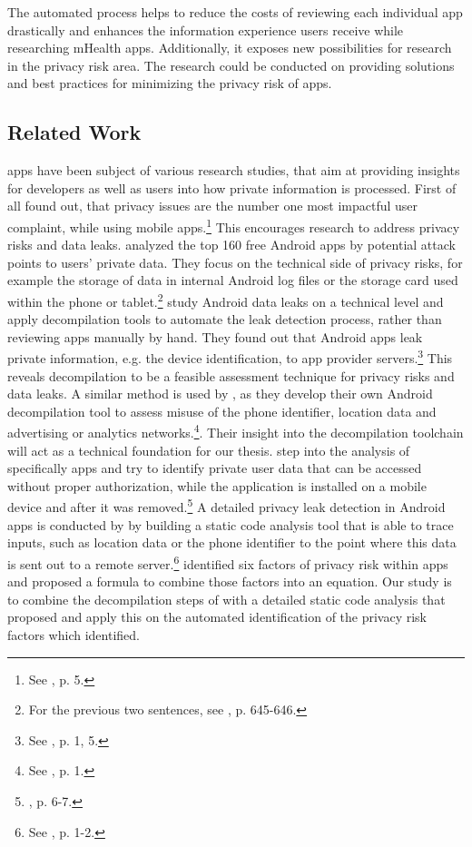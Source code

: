 \documentclass[
	a4paper,
	oneside,
	12pt,
	liststotocnumbered
]{article}
\let\cite\textcite
\begin{document}
The automated process helps to reduce the costs of reviewing each individual app drastically and enhances the information experience users receive while researching mHealth apps.
Additionally, it exposes new possibilities for research in the privacy risk area. The research could be conducted on providing solutions and best practices for minimizing the privacy risk of apps.

\subsection{Related Work}
\mH apps have been subject of various research studies, that aim at providing insights for developers as well as users into how private information is processed.
First of all \cite{Khalid2015} found out, that privacy issues are the number one most impactful user complaint, while using mobile apps.\footnote{See \cite{Khalid2015}, p. 5.}
This encourages research to address privacy risks and data leaks.
\cite{He2014} analyzed the top 160 free Android \mH apps by potential attack points to users' private data. They focus on the technical side of privacy risks, for example the storage of \mH data in internal Android log files or the storage card used within the phone or tablet.\footnote{For the previous two sentences, see \cite{He2014}, p. 645-646.}
\cite{Mcclurg2012} study Android data leaks on a technical level and apply decompilation tools to automate the leak detection process, rather than reviewing apps manually by hand. They found out that Android apps leak private information, e.g. the device identification, to app provider servers.\footnote{See \cite{Mcclurg2012}, p. 1, 5.}
This reveals decompilation to be a feasible assessment technique for privacy risks and data leaks.
A similar method is used by \cite{Enck2011}, as they develop their own Android decompilation tool to assess misuse of the phone identifier, location data and advertising or analytics networks.\footnote{See \cite{Enck2011}, p. 1.}.
Their insight into the decompilation toolchain will act as a technical foundation for our thesis.
\cite{Mitchell2013} step into the analysis of specifically \mH apps and try to identify private user data that can be accessed without proper authorization, while the application is installed on a mobile device and after it was removed.\footnote{\cite{Mitchell2013}, p. 6-7.}
A detailed privacy leak detection in Android apps is conducted by \cite{Kim2012} by building a static code analysis tool that is able to trace inputs, such as location data or the phone identifier to the point where this data is sent out to a remote server.\footnote{See \cite{Kim2012}, p. 1-2.}
\cite{Bruggemann2016} identified six factors of privacy risk within \mH apps and proposed a formula to combine those factors into an equation.
Our study is to combine the decompilation steps of \cite{Enck2011} with a detailed static code analysis that \cite{Kim2012} proposed and apply this on the automated identification of the privacy risk factors which \cite{Bruggemann2016} identified.
\end{document}
